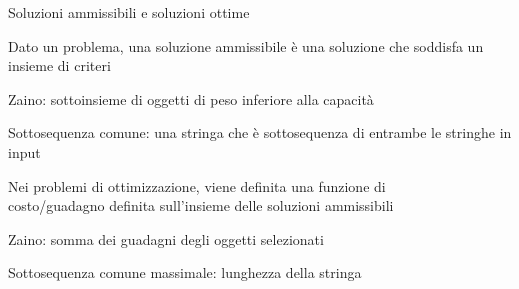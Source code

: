 \begin{frame}{Soluzioni ammissibili e soluzioni ottime}

\vspace{-9pt}
\begin{myboxtitle}
Dato un problema, una \alert{soluzione ammissibile} è una soluzione che \alert{soddisfa un insieme di criteri}
\BIL
\item \alert{Zaino}: sottoinsieme di oggetti di peso inferiore alla capacità
\item \alert{Sottosequenza} comune: una stringa che è sottosequenza di entrambe le stringhe in input
\EIL
\end{myboxtitle}

 
\begin{myboxtitle}
Nei problemi di ottimizzazione, viene definita una \alert{funzione di\\ costo/guadagno} definita sull'insieme delle soluzioni ammissibili
\BIL
\item \alert{Zaino}: somma dei guadagni degli oggetti selezionati
\item \alert{Sottosequenza comune massimale}: lunghezza della stringa
\EIL
\end{myboxtitle}

\end{frame}

